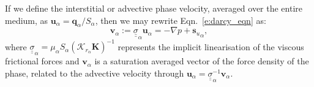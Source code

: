 \documentclass[preprint,authoryear,12pt]{elsarticle}
\begin{document}
If we define the interstitial or advective phase velocity, averaged over the entire medium, as $\mathbf{u}_\alpha= \mathbf{q}_\alpha/S_\alpha$, then we may rewrite Eqn.~\ref{e:darcy_eqn} as:
\begin{equation}
  \bm{v}_\alpha:= {\underline {\underline \sigma}}_{\alpha} \mathbf{u}_{\alpha} = - \nabla p + {\mathbf{s}_{u}}_{\alpha},
  \label{force-bal}
\end{equation}
where ${\underline {\underline \sigma}}_{\alpha}=\mu_\alpha S_\alpha \left(\mathcal{K}_{{r}_\alpha}\mathbf{K}\right)^{-1}$ represents the implicit linearisation of the viscous frictional forces and $\bm{v}_\alpha$ is a saturation averaged vector of the force density of the phase, related to the advective velocity through $\bm{u}_\alpha={\underline {\underline \sigma}}_{\alpha}^{-1}\bm{v}_\alpha$.%
\end{document}

